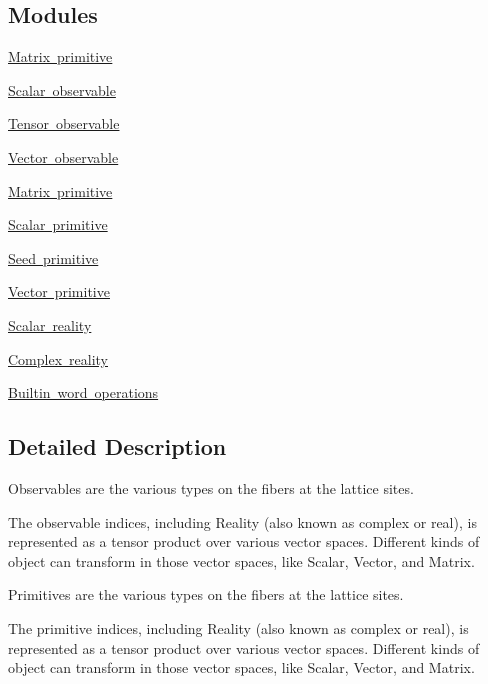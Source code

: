 \subsection*{Modules}
\begin{DoxyCompactItemize}
\item 
\mbox{\hyperlink{group__obsmatrix}{Matrix primitive}}
\item 
\mbox{\hyperlink{group__obsscalar}{Scalar observable}}
\item 
\mbox{\hyperlink{group__obstensor}{Tensor observable}}
\item 
\mbox{\hyperlink{group__obsvector}{Vector observable}}
\item 
\mbox{\hyperlink{group__primmatrix}{Matrix primitive}}
\item 
\mbox{\hyperlink{group__primscalar}{Scalar primitive}}
\item 
\mbox{\hyperlink{group__primseed}{Seed primitive}}
\item 
\mbox{\hyperlink{group__primvector}{Vector primitive}}
\item 
\mbox{\hyperlink{group__rscalar}{Scalar reality}}
\item 
\mbox{\hyperlink{group__rcomplex}{Complex reality}}
\item 
\mbox{\hyperlink{group__simpleword}{Builtin word operations}}
\end{DoxyCompactItemize}


\subsection{Detailed Description}
Observables are the various types on the fibers at the lattice sites.

The observable indices, including Reality (also known as complex or real), is represented as a tensor product over various vector spaces. Different kinds of object can transform in those vector spaces, like Scalar, Vector, and Matrix.

Primitives are the various types on the fibers at the lattice sites.

The primitive indices, including Reality (also known as complex or real), is represented as a tensor product over various vector spaces. Different kinds of object can transform in those vector spaces, like Scalar, Vector, and Matrix. 